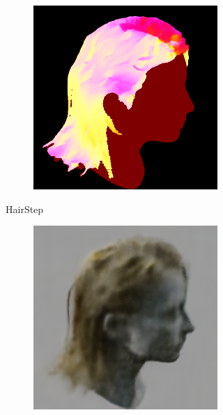 \documentclass{article}
\begin{document}
\begin{figure}[h]
\begin{subfigure}{0.22\textwidth}
\begin{subfigure}{0.48\textwidth}
            \includegraphics[width=\textwidth]{./images/baseline-method/test_6_hairstep.png}
        \end{subfigure}
        \caption{HairStep}
    \end{subfigure}
    \hfill
    \begin{subfigure}{0.22\textwidth}
        \begin{subfigure}{0.48\textwidth}
            \centering
            \includegraphics[width=\textwidth]{./images/baseline-method/pred_6_nerf.png}

\end{subfigure}
\end{subfigure}
\end{figure}
\end{document}
